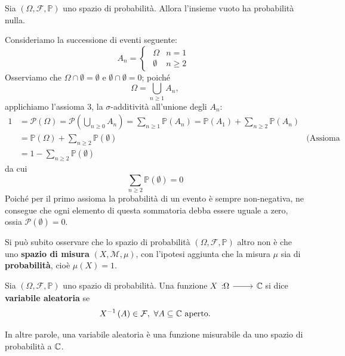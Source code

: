 \begin{proposition}
	Sia $\left(\Omega,\mathcal{F},\mathbb{P}\right)$ uno spazio di probabilità. Allora l'insieme vuoto ha probabilità nulla.
\end{proposition}
\begin{demonstration}
	Consideriamo la successione di eventi seguente:
	\begin{equation*}
		A_n=\begin{cases}
			\begin{array}{ll}
				\Omega&n=1\\
				\emptyset&n\geq2
			\end{array}
		\end{cases}
	\end{equation*}
	Osserviamo che $\Omega\cap \emptyset=\emptyset$ e $\emptyset\cap\emptyset=0$; poiché
	\begin{equation*}
		\Omega=\bigcup_{n\geq 1}A_n,
	\end{equation*}
	applichiamo l'assioma 3, la $\sigma$-additività all'unione degli $A_n$:
	\begin{align*}
		1&=\mathcal{P}\left(\Omega\right)=\mathcal{P}\left(\bigcup_{n\geq 0}A_n\right)=\sum_{n\geq 1}\mathbb{P}\left(A_n\right)=\mathbb{P}\left(A_1\right)+\sum_{n\geq2}\mathbb{P}\left(A_n\right)&\\
		&=\mathbb{P}\left(\Omega\right)+\sum_{n\geq 2}\mathbb{P}\left(\emptyset\right)&\text{(Assioma 1)}\\
		&=1-\sum_{n\geq 2}\mathbb{P}\left(\emptyset\right)&
	\end{align*}
	da cui
	\begin{equation*}
		\sum_{n\geq 2}\mathbb{P}\left(\emptyset\right)=0
	\end{equation*}
	Poiché per il primo assioma la probabilità di un evento è sempre non-negativa, ne consegue che ogni elemento di questa sommatoria debba essere uguale a zero, ossia $\mathcal{P}\left(\emptyset\right)=0$.
\end{demonstration}
Si può subito osservare che lo spazio di probabilità $\left(\Omega,\mathcal{F},\mathbb{P}\right)$ altro non è che uno \textbf{spazio di misura} $\left(X,\mathcal{M},\mu\right)$, con l'ipotesi aggiunta che la misura $\mu$ sia di \textbf{probabilità}, cioè $\mu(X)=1$.
\begin{define}
	Sia $\left(\Omega,\mathcal{F},\mathbb{P}\right)$ uno spazio di probabilità. Una funzione $\funz{X}{\Omega}{\complexset}$ si dice \textbf{variabile aleatoria} se \begin{equation}
		X^{-1}\left(A\right)\in\mathcal{F},\ \forall A\subseteq \mathbb{C}\text{ aperto.}
	\end{equation}
\end{define}
In altre parole, una variabile aleatoria è una funzione misurabile da uno spazio di probabilità a $\mathbb{C}$.
